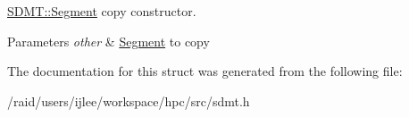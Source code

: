 \hyperlink{struct_s_d_m_t_1_1_segment}{S\+D\+M\+T\+::\+Segment} copy constructor. 


\begin{DoxyParams}{Parameters}
{\em other} & \hyperlink{struct_s_d_m_t_1_1_segment}{Segment} to copy \\
\hline
\end{DoxyParams}


The documentation for this struct was generated from the following file\+:\begin{DoxyCompactItemize}
\item 
/raid/users/ijlee/workspace/hpc/src/sdmt.\+h\end{DoxyCompactItemize}
